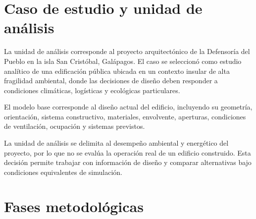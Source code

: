 \par\medskip

\section{Caso de estudio y unidad de análisis}

\begin{textoDosTercios}
La unidad de análisis corresponde al proyecto arquitectónico de la Defensoría del Pueblo en la isla San Cristóbal, Galápagos. El caso se seleccionó como estudio analítico de una edificación pública ubicada en un contexto insular de alta fragilidad ambiental, donde las decisiones de diseño deben responder a condiciones climáticas, logísticas y ecológicas particulares.

El modelo base corresponde al diseño actual del edificio, incluyendo su geometría, orientación, sistema constructivo, materiales, envolvente, aperturas, condiciones de ventilación, ocupación y sistemas previstos.

La unidad de análisis se delimita al desempeño ambiental y energético del proyecto, por lo que no se evalúa la operación real de un edificio construido. Esta decisión permite trabajar con información de diseño y comparar alternativas bajo condiciones equivalentes de simulación.
\end{textoDosTercios}

\par\medskip

\section{Fases metodológicas}


\par\medskip

